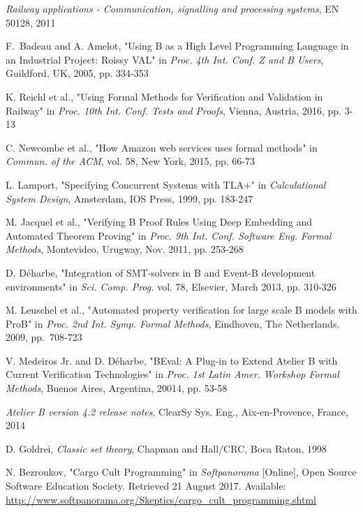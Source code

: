 \documentclass[11pt,journal]{IEEEtran}
\begin{document}
\begin{thebibliography}{2}
		\emph{Railway applications - Communication, signalling and processing systems}, EN 50128, 2011
		
		F.~Badeau and A. Amelot, "Using B as a High Level Programming Language in an Industrial Project: Roissy VAL" in \emph{Proc. 4th Int. Conf. Z and B Users}, Guildford, UK, 2005, pp. 334-353
		
		K. Reichl et al., "Using Formal Methods for Verification and Validation in Railway" in \emph{Proc. 10th Int. Conf. Tests and Proofs}, Vienna, Austria, 2016, pp. 3-13
		
		C. Newcombe et al., "How Amazon web services uses formal methods" in \emph{Commun. of the ACM}, vol. 58, New York, 2015, pp. 66-73
		
		L. Lamport, "Specifying Concurrent Systems with TLA+" in \emph{Calculational System Design}, Amsterdam, IOS Press, 1999, pp. 183-247
		
		M. Jacquel et al., "Verifying B Proof Rules Using Deep Embedding and Automated Theorem Proving" in \emph{Proc. 9th Int. Conf. Software Eng. Formal Methods}, Montevideo, Urugway, Nov. 2011, pp. 253-268
		
		D. D\'{e}harbe, "Integration of SMT-solvers in B and Event-B development environments" in \emph{Sci. Comp. Prog.} vol. 78, Elsevier, March 2013, pp. 310-326
		
		M. Leuschel et al., "Automated property verification for large scale B models with ProB" in \emph{Proc. 2nd Int. Symp. Formal Methods}, Eindhoven, The Netherlands. 2009, pp.~708-723
		
		V. Medeiros Jr. and D. D\'{e}harbe, "BEval: A Plug-in to Extend Atelier B with Current Verification Technologies" in \emph{Proc. 1st Latin Amer. Workshop Formal Methods}, Buenos Aires, Argentina, 20014, pp. 53-58
		
		\emph{Atelier B version 4.2 release notes}, ClearSy Sys. Eng., Aix-en-Provence, France, 2014
		
		D. Goldrei, \emph{Classic set theory}, Chapman and Hall/CRC, Boca Raton, 1998
		
		N. Bezroukov, "Cargo Cult Programming" in \emph{Softpanorama} [Online],  Open Source Software Education Society. Retrieved 21 August 2017. Available: \url{http://www.softpanorama.org/Skeptics/cargo_cult_programming.shtml}
		

\end{thebibliography}
\end{document}
